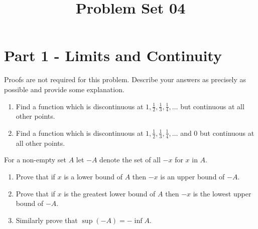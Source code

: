 \documentclass[9pt, a4paper, oneside]{amsart}
\title{Problem Set 04}
\begin{document}
\maketitle
\thispagestyle{fancy}


\section*{Part 1 - Limits and Continuity}
\begin{questions}
	\item Proofs are not required for this problem. Describe your answers as precisely as possible and provide some explanation.

	\begin{enumerate}
		\item Find a function which is discontinuous at $1, \frac{1}{2}, \frac{1}{3},\frac{1}{4}, \ldots$ but continuous at all other points.
		\item Find a function which is discontinuous at $1, \frac{1}{2}, \frac{1}{3},\frac{1}{4}, \ldots$ and 0 but continuous at all other points.
	\end{enumerate}

	\item For a non-empty set $ A$ let $ -A$ denote the set of all $ -x$ for $ x$ in $ A$.
	\begin{enumerate}
		\item Prove that if $ x$ is a lower bound of $ A$ then $ -x$ is an upper bound of $ -A$.
		\item Prove that if $ x$ is the greatest lower bound of $ A$ then $ -x$ is the lowest upper bound of $ -A$.
		\item Similarly prove that $ \sup (-A) = - \inf A$.
	\end{enumerate}


\end{questions}
\end{document}
